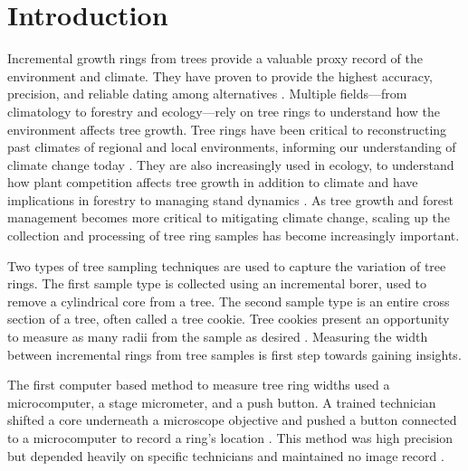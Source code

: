 \documentclass[a4paper,12pt]{article}
\begin{document}
\section{Introduction}
Incremental growth rings from trees provide a valuable proxy record of the environment and climate. They have proven to provide the highest accuracy, precision, and reliable dating among alternatives \citep{mann_northern_1999}. Multiple fields---from climatology to forestry and ecology---rely on tree rings to understand how the environment affects tree growth. Tree rings have been critical to 
reconstructing past climates of regional and local environments, informing our understanding of climate change today \citep{fritts_dendroclimatology_1971} \citep{williams_using_2010} \citep{guibal_dendrochronology_2021} \citep{sheppard_dendroclimatology_2010}. They are also increasingly used in ecology, to understand how plant competition affects tree growth in addition to climate \citep{buechling_climate_2017} and have implications in forestry to managing stand dynamics \citep{canham_neighborhood_2004}. 
As tree growth and forest management becomes more critical to mitigating climate change, scaling up the collection and processing of tree ring samples has become increasingly important. 

Two types of tree sampling techniques are used to capture the variation of tree rings. The first sample type is collected using an incremental borer, used to remove a cylindrical core from a tree. 
The second sample type is an entire cross section of a tree, often called a tree cookie. Tree cookies present an opportunity to measure as many radii from the sample as desired \citep{speer_fundamentals_2010}.
Measuring the width between incremental rings from tree samples is first step towards gaining insights.

The first computer based method to measure tree ring widths used a microcomputer, a stage micrometer, and a push button. A trained technician shifted a core underneath a microscope objective and pushed a button connected to a microcomputer to record a ring's location \citep{robinson_microcomputer_1980}. 
This method was high precision but depended heavily on specific technicians and maintained no image record \citep{levanic_atrics_2007}. 
\end{document}
